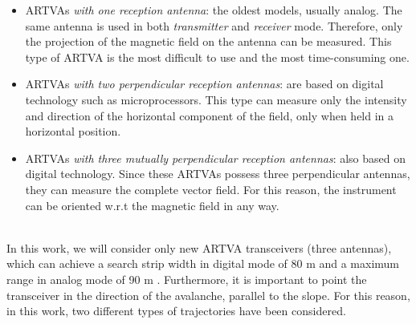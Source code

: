 \documentclass[main]{subfiles}
\begin{document}
\begin{itemize}
    \item ARTVAs \textit{with one reception antenna}: the oldest models, usually
 analog. The same antenna is used in both \textit{transmitter} and 
    \textit{receiver} mode. Therefore, only the projection of the magnetic field 
 on the antenna can be measured. This type of ARTVA is the most difficult to 
 use and the most time-consuming one.
    
    \item ARTVAs \textit{with two perpendicular reception antennas}: are based on 
 digital technology such as microprocessors. This type can measure only the 
 intensity and direction of the horizontal component of the field, only when 
 held in a horizontal position.
    
    \item ARTVAs \textit{with three mutually perpendicular reception antennas}: 
 also based on digital technology. Since these ARTVAs possess three 
 perpendicular antennas, they can measure the complete vector field. For this 
 reason, the instrument can be oriented w.r.t the magnetic field in any way.
\end{itemize}

\noindent\\
In this work, we will consider only new ARTVA transceivers (three antennas), 
which can achieve a search strip width in digital mode of 80 m and a maximum 
range in analog mode of 90 m \cite{manual}. Furthermore, it is important to point 
the transceiver in the direction of the avalanche, parallel to the slope. For 
this reason, in this work, two different types of trajectories have been 
considered.
\end{document}
